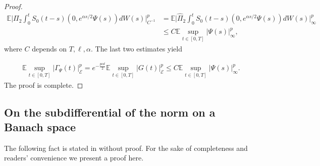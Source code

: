 \documentclass[10pt, reqno]{amsart}
\newcommand{\ex}{\mathbb{E}}
\newcommand{\e}{\mathcal{E}}
\theoremstyle{definition}
\numberwithin{lem}{section}
\numberwithin{cor}{section}
\numberwithin{prop}{section}
\numberwithin{thm}{section}
\numberwithin{dfn}{section}
\begin{document}
\begin{proof}
\begin{equation*}
\begin{aligned}
   \ex \bigg|\Pi_2 \int_0^t S_0(t-s)(0, e^{\alpha s/2}\Psi(s))dW(s)   \bigg|_{C^{-1}}^p&= \ex \bigg|\widehat{\Pi}_2\int_0^t S_0(t-s)(0, e^{\alpha s/2}\Psi(s))dW(s)   \bigg|_{\infty}^p\\&\leq C\ex\sup_{t\in[0,T]}|\Psi(s)|^p_\infty,
\end{aligned}
\end{equation*}
where $C$ depends on $T, \ell, \alpha.$ The last two estimates yield


\begin{equation*}
\begin{aligned}
    \ex\sup_{t\in[0,T]}|\Gamma_{\Psi}(t)|^p_{\e}= e^{-\frac{p\alpha t}{2}}\ex\sup_{t\in[0,T]}|G(t)|^p_{\e}\leq C \ex\sup_{t\in[0,T]}|\Psi(s)|^p_\infty.
\end{aligned} 
\end{equation*}
The proof is complete.
 \end{proof}



\subsection{On the subdifferential of the norm on a Banach space}\label{App:Subdifferential} The following fact is stated in \cite[Equation (D.2)]{da2014stochastic} without proof. For the sake of completeness and readers' convenience we present a proof here.
\end{document}
